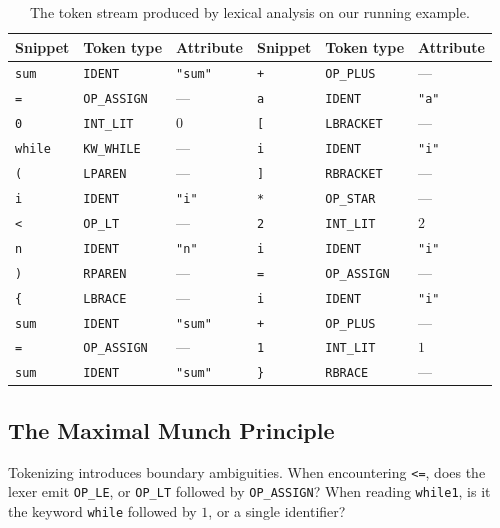 \begin{table}[H]
\centering
\small
\begin{tabular}{lll@{\qquad}lll}
\toprule
\textbf{Snippet} & \textbf{Token type} & \textbf{Attribute} & \textbf{Snippet} & \textbf{Token type} & \textbf{Attribute} \\
\midrule
\texttt{sum} & \texttt{IDENT} & \texttt{"sum"} & \texttt{+} & \texttt{OP\_PLUS} & --- \\
\texttt{=} & \texttt{OP\_ASSIGN} & --- & \texttt{a} & \texttt{IDENT} & \texttt{"a"} \\
\texttt{0} & \texttt{INT\_LIT} & $0$ & \texttt{[} & \texttt{LBRACKET} & --- \\
\texttt{while} & \texttt{KW\_WHILE} & --- & \texttt{i} & \texttt{IDENT} & \texttt{"i"} \\
\texttt{(} & \texttt{LPAREN} & --- & \texttt{]} & \texttt{RBRACKET} & --- \\
\texttt{i} & \texttt{IDENT} & \texttt{"i"} & \texttt{*} & \texttt{OP\_STAR} & --- \\
\texttt{<} & \texttt{OP\_LT} & --- & \texttt{2} & \texttt{INT\_LIT} & $2$ \\
\texttt{n} & \texttt{IDENT} & \texttt{"n"} & \texttt{i} & \texttt{IDENT} & \texttt{"i"} \\
\texttt{)} & \texttt{RPAREN} & --- & \texttt{=} & \texttt{OP\_ASSIGN} & --- \\
\texttt{\{} & \texttt{LBRACE} & --- & \texttt{i} & \texttt{IDENT} & \texttt{"i"} \\
\texttt{sum} & \texttt{IDENT} & \texttt{"sum"} & \texttt{+} & \texttt{OP\_PLUS} & --- \\
\texttt{=} & \texttt{OP\_ASSIGN} & --- & \texttt{1} & \texttt{INT\_LIT} & $1$ \\
\texttt{sum} & \texttt{IDENT} & \texttt{"sum"} & \texttt{\}} & \texttt{RBRACE} & --- \\
\bottomrule
\end{tabular}
\caption{The token stream produced by lexical analysis on our running example.}
\label{ch41:tab-tokens}
\end{table}

\subsection{The Maximal Munch Principle}

Tokenizing introduces boundary ambiguities. When encountering \texttt{<=}, does
the lexer emit \texttt{OP\_LE}, or \texttt{OP\_LT} followed by \texttt{OP\_ASSIGN}?
When reading \texttt{while1}, is it the keyword \texttt{while} followed by $1$,
or a single identifier?

